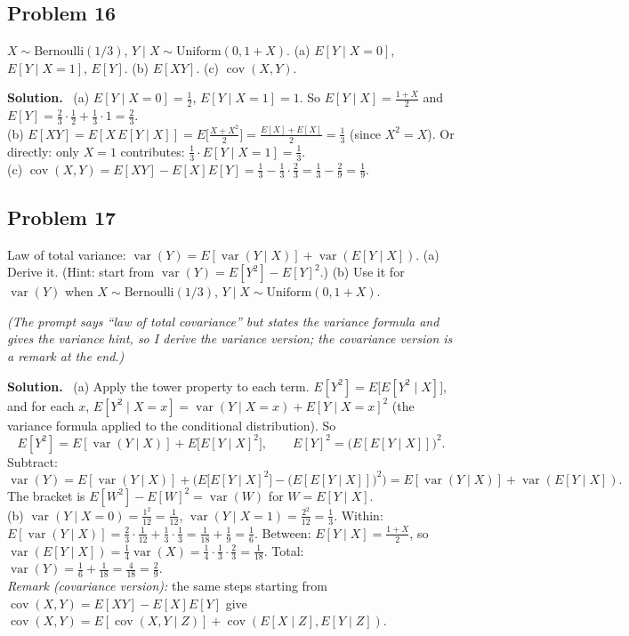 \documentclass[11pt]{article}
\newcommand{\Bern}{\text{Bernoulli}}
\newcommand{\Unif}{\text{Uniform}}
\newenvironment{soln}{\par\smallskip\noindent\textbf{Solution.}\ }{\par\medskip}
\begin{document}
\subsection*{Problem 16}
$X\sim\Bern(1/3)$, $Y\mid X\sim\Unif(0,1+X)$. (a) $E[Y\mid X{=}0]$, $E[Y\mid X{=}1]$, $E[Y]$. (b) $E[XY]$. (c) $\operatorname{cov}(X,Y)$.
\begin{soln}
(a) $E[Y\mid X{=}0]=\frac12$, $E[Y\mid X{=}1]=1$. So $E[Y\mid X]=\frac{1+X}2$ and $E[Y]=\frac23\cdot\frac12+\frac13\cdot1=\frac23$.\\
(b) $E[XY]=E[X\,E[Y\mid X]]=E\big[\tfrac{X+X^2}2\big]=\tfrac{E[X]+E[X]}2=\tfrac13$ (since $X^2=X$). Or directly: only $X{=}1$ contributes: $\frac13\cdot E[Y\mid X{=}1]=\frac13$.\\
(c) $\operatorname{cov}(X,Y)=E[XY]-E[X]E[Y]=\frac13-\frac13\cdot\frac23=\frac13-\frac29=\frac19$.
\end{soln}

\subsection*{Problem 17}
Law of total variance: $\operatorname{var}(Y)=E[\operatorname{var}(Y\mid X)]+\operatorname{var}(E[Y\mid X])$. (a) Derive it. (Hint: start from $\operatorname{var}(Y)=E[Y^2]-E[Y]^2$.) (b) Use it for $\operatorname{var}(Y)$ when $X\sim\Bern(1/3)$, $Y\mid X\sim\Unif(0,1+X)$.

\emph{(The prompt says ``law of total covariance'' but states the variance formula and gives the variance hint, so I derive the variance version; the covariance version is a remark at the end.)}
\begin{soln}
(a) Apply the tower property to each term. $E[Y^2]=E\big[E[Y^2\mid X]\big]$, and for each $x$, $E[Y^2\mid X{=}x]=\operatorname{var}(Y\mid X{=}x)+E[Y\mid X{=}x]^2$ (the variance formula applied to the conditional distribution). So
\[
E[Y^2]=E[\operatorname{var}(Y\mid X)]+E\big[E[Y\mid X]^2\big],\qquad E[Y]^2=\big(E[E[Y\mid X]]\big)^2.
\]
Subtract:
\[
\operatorname{var}(Y)=E[\operatorname{var}(Y\mid X)]+\Big(E\big[E[Y\mid X]^2\big]-\big(E[E[Y\mid X]]\big)^2\Big)=E[\operatorname{var}(Y\mid X)]+\operatorname{var}(E[Y\mid X]).
\]
The bracket is $E[W^2]-E[W]^2=\operatorname{var}(W)$ for $W=E[Y\mid X]$. \checkmark\\[3pt]
(b) $\operatorname{var}(Y\mid X{=}0)=\frac{1^2}{12}=\frac1{12}$, $\operatorname{var}(Y\mid X{=}1)=\frac{2^2}{12}=\frac13$. Within: $E[\operatorname{var}(Y\mid X)]=\frac23\cdot\frac1{12}+\frac13\cdot\frac13=\frac1{18}+\frac19=\frac16$.
Between: $E[Y\mid X]=\frac{1+X}2$, so $\operatorname{var}(E[Y\mid X])=\frac14\operatorname{var}(X)=\frac14\cdot\frac13\cdot\frac23=\frac1{18}$.
Total: $\operatorname{var}(Y)=\frac16+\frac1{18}=\frac{4}{18}=\frac29$.\\[3pt]
\emph{Remark (covariance version):} the same steps starting from $\operatorname{cov}(X,Y)=E[XY]-E[X]E[Y]$ give
$\operatorname{cov}(X,Y)=E[\operatorname{cov}(X,Y\mid Z)]+\operatorname{cov}(E[X\mid Z],E[Y\mid Z])$.
\end{soln}
\end{document}
